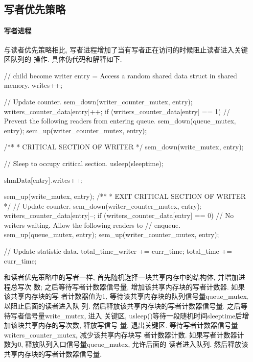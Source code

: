 \subsection{写者优先策略}
\paragraph{写者进程}
与读者优先策略相比, 写者进程增加了当有写者正在访问的时候阻止读者进入关键区队列的
操作. 具体伪代码和解释如下.
\begin{code}
// child become writer
entry = Access a random shared data struct in shared memory.
writes++;

// Update counter.
sem_down(writer_counter_mutex, entry);
writers_counter_data[entry]++;
if (writers_counter_data[entry] == 1) {
        // Prevent the following readers from entering queue.
        sem_down(queue_mutex, entry);
    }
sem_up(writer_counter_mutex, entry);

/**
* CRITICAL SECTION OF WRITER
*/
sem_down(write_mutex, entry);

// Sleep to occupy critical section.
    usleep(sleeptime);

    shmData[entry].writes++;

sem_up(write_mutex, entry);
    /**
    * EXIT CRITICAL SECTION OF WRITER
    */
// Update counter.
sem_down(writer_counter_mutex, entry);
writers_counter_data[entry]--;
if (writers_counter_data[entry] == 0) {
        // No writers waiting. Allow the following readers to
        // enqueue.
        sem_up(queue_mutex, entry);
    }
sem_up(writer_counter_mutex, entry);

    // Update statistic data.
    total_time_writer += curr_time;
    total_time += curr_time;

\end{code}

和读者优先策略中的写者一样, 首先随机选择一块共享内存中的结构体, 并增加进程总写次
数; 之后等待写者计数器信号量, 增加该共享内存块的写者计数器. 如果该共享内存块的写
者计数器值为1, 等待该共享内存块的队列信号量queue\_mutex, 以阻止后面的读者进入队
列. 然后释放该共享内存块的写者计数器信号量. 之后等待写者信号量write\_mutex, 进入
关键区, usleep()等待一段随机时间sleeptime后增加该块共享内存的写次数, 释放写信号
量, 退出关键区. 等待写者计数器信号量writers\_counter\_mutex, 减少该共享内存块写
者计数器计数. 如果写者计数器计数为0, 释放队列入口信号量queue\_mutex, 允许后面的
读者进入队列. 然后释放该共享内存块的写者计数器信号量.

